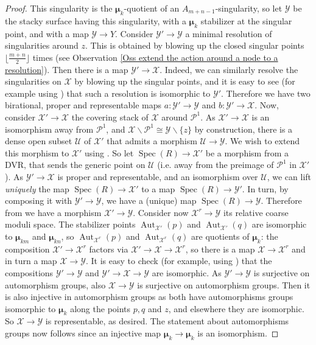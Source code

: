 \documentclass{amsart}
\newcommand{\cP}{\mathcal{P}}
\newcommand{\cU}{\mathcal{U}}
\newcommand{\cX}{\mathcal{X}}
\newcommand{\cY}{\mathcal{Y}}
\newcommand{\spec}{\operatorname{Spec}}
\newcommand{\bmu}{\bm{\mu}}
\theoremstyle{definition}
\begin{document}
\begin{proof}
 This singularity is the $\bmu_k$-quotient of an $A_{m+n-1}$-singularity, so let $\cY$ be the stacky surface having this singularity,  with a $\bmu_k$ stabilizer at the singular point, and with a map $\cY\to Y$.  Consider $\cY'\to \cY$ a minimal resolution of singularities around $z$. This is obtained by blowing up the closed singular points $\lfloor \frac{m+n}{2} \rfloor$ times (see Observation \ref{Oss extend the action around a node to a resolution}). Then there is a map $\cY'\to \cX$. Indeed, we can similarly resolve the singularities on $\cX$ by blowing up the singular points, and it is easy to see (for example using \cite{GS17}) that such a resolution is isomorphic to $\cY'$. Therefore we have two birational, proper and representable maps $a:\cY'\to \cY$ and $b:\cY'\to \cX$.
Now, consider $\cX'\to \cX$ the covering stack of $\cX$ around $\cP^1$.   As $\cX'\to \cX$ is an isomorphism away from $\cP^1$,  and $\cX\smallsetminus \cP^1 \cong \cY\smallsetminus \{z\}$ by construction, there is a dense open subset $\cU$ of $\cX'$ that admits a morphism $\cU\to \cY$.  We wish to extend this morphism to $\cX'$ using \cite[Lemma 7.4]{DH18}. So let $\spec(R)\to \cX'$ be a morphism from a DVR, that sends the generic point on $\cU$ (i.e. away from the preimage of $\cP^1$ in $\cX'$). As $\cY'\to \cX$ is proper and representable, and an isomorphism over $\cU$, we can lift \emph{uniquely} the map $\spec(R)\to \cX'$ to a map $\spec(R)\to \cY'$. In turn, by composing it with $\cY'\to \cY$, we have a (unique) map $\spec(R)\to \cY$. Therefore from \cite[Lemma 7.4]{DH18} we have a morphism $\cX'\to \cY$. Consider now $\cX^r\to \cY$ its relative coarse moduli space. The stabilizer points $\operatorname{Aut}_{\cX'}(p)$ and $\operatorname{Aut}_{\cX'}(q)$ are isomorphic to $\bmu_{km}$ and $\bmu_{kn}$, so $\operatorname{Aut}_{\cX^r}(p)$ and $\operatorname{Aut}_{\cX^r}(q)$ are quotients of $\bmu_k$: the composition $\cX'\to \cX^r$ factors via $\cX'\to \cX\to \cX^r$, so there is a map $\cX\to \cX^r$ and in turn a map $\cX\to \cY$.  It is easy to check (for example, using \cite[Lemma 7.2]{DH18}) that the compositions $\cY'\to \cY$ and $\cY'\to \cX\to \cY$ are isomorphic.  As $\cY'\to \cY$ is surjective on automorphism groups, also $\cX\to \cY$ is surjective on automorphism groups. Then it is also injective in automorphism groups as both have automorphisms groups isomorphic to $\bmu_k$ along the points $p,q$ and $z$, and elsewhere they are isomorphic. So $\cX\to \cY$ is representable, as desired. The statement about automorphisms groups now follows since an injective map $\bmu_k\to \bmu_k$ is an isomorphism.
\end{proof}
\end{document}
